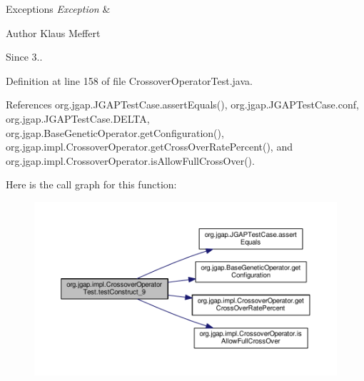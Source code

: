 \begin{DoxyExceptions}{Exceptions}
{\em Exception} & \\
\hline
\end{DoxyExceptions}
\begin{DoxyAuthor}{Author}
Klaus Meffert 
\end{DoxyAuthor}
\begin{DoxySince}{Since}
3.. 
\end{DoxySince}


Definition at line 158 of file Crossover\-Operator\-Test.\-java.



References org.\-jgap.\-J\-G\-A\-P\-Test\-Case.\-assert\-Equals(), org.\-jgap.\-J\-G\-A\-P\-Test\-Case.\-conf, org.\-jgap.\-J\-G\-A\-P\-Test\-Case.\-D\-E\-L\-T\-A, org.\-jgap.\-Base\-Genetic\-Operator.\-get\-Configuration(), org.\-jgap.\-impl.\-Crossover\-Operator.\-get\-Cross\-Over\-Rate\-Percent(), and org.\-jgap.\-impl.\-Crossover\-Operator.\-is\-Allow\-Full\-Cross\-Over().



Here is the call graph for this function\-:
\nopagebreak
\begin{figure}[H]
\begin{center}
\leavevmode
\includegraphics[width=350pt]{classorg_1_1jgap_1_1impl_1_1_crossover_operator_test_aee4b6ccb946ca1c408c4e24406a23ba8_cgraph}
\end{center}
\end{figure}


